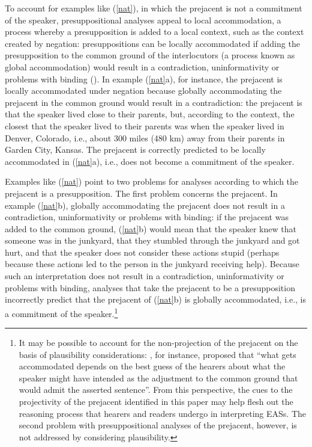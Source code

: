\documentclass[11pt,fleqn]{article}
\newcommand{\6}{\mbox{$[\hspace*{-.6mm}[$}}
\newcommand{\9}{\mbox{$]\hspace*{-.6mm}]$}}
\begin{document}
To account for examples like (\ref{nat}), in which the prejacent is not a commitment of the speaker, presuppositional analyses appeal to local accommodation, a process whereby a presupposition is added to a local context, such as the context created by negation: presuppositions can be locally accommodated if adding the presupposition to the common ground of the interlocutors (a process known as global accommodation) would result in a contradiction, uninformativity or problems with
binding (\citealt{heim82,vds92}). In example (\ref{nat}a), for instance, the prejacent is locally accommodated under negation because globally accommodating the prejacent in the common ground would result in a contradiction: the prejacent is that the speaker lived close to their parents, but, according to the context, the closest that the speaker lived to their parents was when the speaker lived in Denver, Colorado, i.e., about 300 miles (480 km) away from their parents in Garden City, Kansas. The prejacent is correctly predicted to be locally accommodated in (\ref{nat}a), i.e., does not become a commitment of the speaker.

Examples like (\ref{nat}) point to two problems for analyses according to which the prejacent is a presupposition. The first problem concerns the prejacent. In example (\ref{nat}b), globally accommodating the prejacent does not result in a contradiction, uninformativity or problems with
binding: if the prejacent was added to the common ground,
(\ref{nat}b) would mean that the speaker knew that someone was in the
junkyard, that they stumbled through the junkyard and got hurt, and that
the speaker does not consider these actions stupid (perhaps because these actions
led to the person in the junkyard receiving help). Because such an interpretation does not result in a contradiction, uninformativity or problems with
binding, analyses that take the prejacent to be a presupposition incorrectly  predict that the prejacent of (\ref{nat}b) is globally accommodated, i.e., is a commitment of the speaker.\footnote{It may be possible to account for the non-projection of the prejacent on the basis of plausibility considerations: \citealt[162]{vonfintel08}, for instance,  proposed that ``what gets accommodated depends on the best guess of the hearers about what the speaker might have intended as the adjustment to the common ground that would admit the asserted sentence''. From this perspective, the cues to the projectivity of the prejacent identified in this paper may help flesh out the reasoning process that hearers and readers undergo in interpreting EASs. The second problem with presuppositional analyses of the prejacent, however, is not addressed by considering plausibility.}
\end{document}
